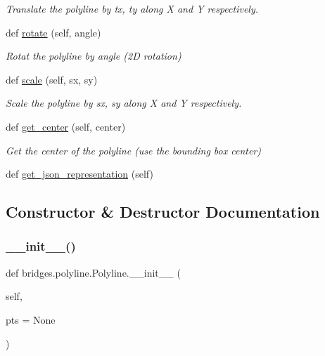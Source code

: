 \begin{DoxyCompactItemize}
\begin{DoxyCompactList}\small\item\em Translate the polyline by tx, ty along X and Y respectively. \end{DoxyCompactList}\item 
def \hyperlink{classbridges_1_1polyline_1_1_polyline_ab72d0a3cfdc4c3a7efec194f54f8a14a}{rotate} (self, angle)
\begin{DoxyCompactList}\small\item\em Rotat the polyline by \textquotesingle{}angle\textquotesingle{} (2D rotation) \end{DoxyCompactList}\item 
def \hyperlink{classbridges_1_1polyline_1_1_polyline_a2727d3d6fa9da5ea738c51f822da16ae}{scale} (self, sx, sy)
\begin{DoxyCompactList}\small\item\em Scale the polyline by sx, sy along X and Y respectively. \end{DoxyCompactList}\item 
def \hyperlink{classbridges_1_1polyline_1_1_polyline_a381cd78da11db3ce98fa87acd1d57449}{get\+\_\+center} (self, center)
\begin{DoxyCompactList}\small\item\em Get the center of the polyline (use the bounding box center) \end{DoxyCompactList}\item 
def \hyperlink{classbridges_1_1polyline_1_1_polyline_a7f99e9e20c90068713b54ad64df3f193}{get\+\_\+json\+\_\+representation} (self)
\end{DoxyCompactItemize}


\subsection{Constructor \& Destructor Documentation}
\mbox{\label{classbridges_1_1polyline_1_1_polyline_a536cf599bc221283c8e8d6df2324f23e}} 
\subsubsection{\texorpdfstring{\+\_\+\+\_\+init\+\_\+\+\_\+()}{\_\_init\_\_()}}
{\footnotesize\ttfamily def bridges.\+polyline.\+Polyline.\+\_\+\+\_\+init\+\_\+\+\_\+ (\begin{DoxyParamCaption}\item[{}]{self,  }\item[{}]{pts = {\ttfamily None} }\end{DoxyParamCaption})}



